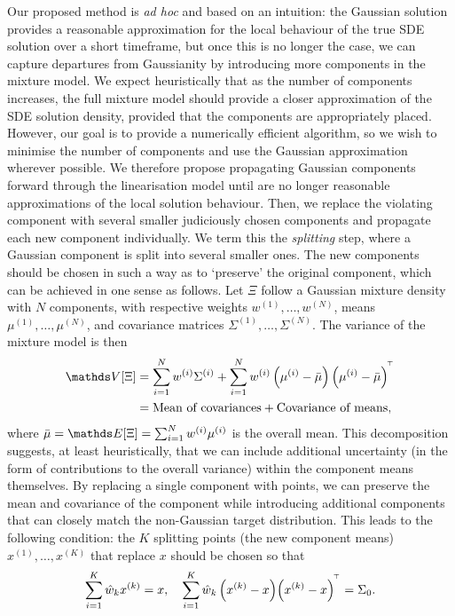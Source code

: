 Our proposed method is \emph{ad hoc} and based on an intuition: the Gaussian solution provides a reasonable approximation for the local behaviour of the true SDE solution over a short timeframe, but once this is no longer the case, we can capture departures from Gaussianity by introducing more components in the mixture model.
We expect heuristically that as the number of components increases, the full mixture model should provide a closer approximation of the SDE solution density, provided that the components are appropriately placed.
However, our goal is to provide a numerically efficient algorithm, so we wish to minimise the number of components and use the Gaussian approximation wherever possible.
We therefore propose propagating Gaussian components forward through the linearisation model until are no longer reasonable approximations of the local solution behaviour.
Then, we replace the violating component with several smaller judiciously chosen components and propagate each new component individually.
We term this the \emph{splitting} step, where a Gaussian component is split into several smaller ones.
The new components should be chosen in such a way as to `preserve' the original component, which can be achieved in one sense as follows.
Let \(\Xi\) follow a Gaussian mixture density with \(N\) components, with respective weights \(w^{(1)}, \dotsc, w^{(N)}\), means \(\mu^{(1)},\dotsc,\mu^{(N)}\), and covariance matrices \(\Sigma^{(1)},\dotsc,\Sigma^{(N)}\).
The variance of the mixture model is then
\begin{align*}
	\var{\Xi} & = \sum_{i=1}^{N}{w^{(i)}\Sigma^{(i)}} + \sum_{i=1}^{N}{w^{(i)}\left(\mu^{(i)} - \bar{\mu}\right)\left(\mu^{(i)} - \bar{\mu}\right)^{\T}} \\
	          & = \text{Mean of covariances} + \text{Covariance of means},
\end{align*}
where \(\bar{\mu} = \avg{\Xi} = \sum_{i=1}^{N}{w^{(i)}\mu^{(i)}}\) is the overall mean.
This decomposition suggests, at least heuristically, that we can include additional uncertainty (in the form of contributions to the overall variance) within the component means themselves.
By replacing a single component with points, we can preserve the mean and covariance of the component while introducing additional components that can closely match the non-Gaussian target distribution.
This leads to the following condition: the \(K\) splitting points (the new component means) \(x^{(1)}, \dotsc, x^{(K)}\) that replace \(x\) should be chosen so that
\begin{equation}
	\sum_{i=1}^K{\hat{w}_k x^{(k)}} = x, \quad \sum_{i=1}^{K}{\hat{w}_k\left(x^{(k)} - x\right)\!\left(x^{(k)} - x\right)^{^{\!\top}}} = \Sigma_0.
	\label{eqn:cov_split_points}
\end{equation}
